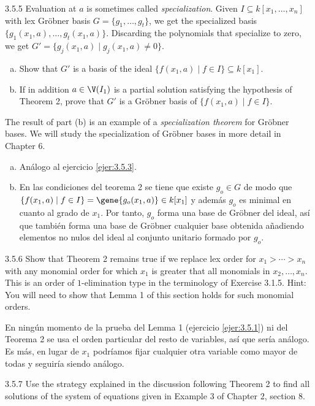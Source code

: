 \documentclass[twoside]{article}
\begin{document}
\begin{ejercicio}{3.5.5}
Evaluation at $a$ is sometimes called \emph{specialization}.
Given $I \subseteq k[x_1,\dots,x_n]$ with lex Gröbner basis $G = \{g_1,\dots,g_t\}$, we get the specialized basis $\{g_1(x_1,a),\dots,g_t(x_1,a)\}$.
Discarding the polynomials that specialize to zero, we get $G' = \{g_j(x_1,a) \mid g_j(x_1,a) \neq 0\}$.
\begin{enumerate}[a.]
\item Show that $G'$ is a basis of the ideal $\{f(x_1,a) \mid f \in I\} \subseteq k[x_1]$.
\item If in addition $a \in \V(I_1)$ is a partial solution satisfying the hypothesis of Theorem 2, prove that $G'$ is a Gröbner basis of $\{f(x_1,a) \mid f \in I\}$.
\end{enumerate}
The result of part (b) is an example of a \emph{specialization theorem} for Gröbner bases.
We will study the specialization of Gröbner bases in more detail in Chapter 6.
\end{ejercicio}
\begin{solucion}
\begin{enumerate}[a.]
\item Análogo al ejercicio \ref{ejer:3.5.3}.
\item En las condiciones del teorema 2 se tiene que existe $g_o\in G$ de modo que $\{f(x_1,a) \mid f \in I\}=\gene{g_o(x_1,a)}\in k[x_1]$ y además $g_o$ es minimal en cuanto al grado de $x_1$. Por tanto, $g_o$ forma una base de Gröbner del ideal, así que también forma una base de Gröbner cualquier base obtenida añadiendo elementos no nulos del ideal al conjunto unitario formado por $g_o$. 
\end{enumerate}
\end{solucion}
\newpage

\begin{ejercicio}{3.5.6}
Show that Theorem 2 remains true if we replace lex order for $x_1 > \cdots > x_n$ with any monomial order for which $x_1$ is greater that all monomials in $x_2,\dots,x_n$.
This is an order of $1$-elimination type in the terminology of Exercise 3.1.5.
Hint: You will need to show that Lemma 1 of this section holds for such monomial orders.
\end{ejercicio}
\begin{solucion}
En ningún momento de la prueba del Lemma 1 (ejercicio \ref{ejer:3.5.1}) ni del Teorema 2 se usa el orden particular del resto de variables, así que sería análogo. Es más, en lugar de $x_1$ podríamos fijar cualquier otra variable como mayor de todas y seguiría siendo análogo.
\end{solucion}
\newpage

\begin{ejercicio}{3.5.7}
Use the strategy explained in the discussion following Theorem 2 to find all solutions of the system of equations given in Example 3 of Chapter 2, section 8.
\end{ejercicio}
\end{document}
